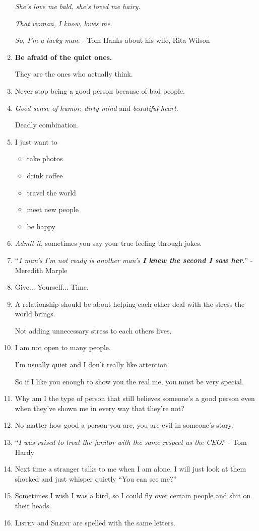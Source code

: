 \documentclass{article}
\begin{document}
\begin{enumerate}
	\textit{She's love me bald, she's loved me hairy}.
	
	\textit{That woman, I know, loves me}.
	
	\textit{So, I'm a lucky man}. - Tom Hanks about his wife, Rita Wilson
	\item \textbf{Be afraid of the quiet ones.}
	
	They are the ones who actually think.
	\item Never stop being a good person because of bad people.
	\item \textit{Good sense of humor}, \textit{dirty mind} and \textit{beautiful heart}.
	
	Deadly combination.
	\item I just want to
	\begin{itemize}
		\item take photos
		\item drink coffee
		\item travel the world
		\item meet new people
		\item be happy
	\end{itemize}
	\item \textit{Admit it}, sometimes you say your true feeling through jokes.
	\item ``\textit{1 man's \emph{I'm not ready} is another man's \textbf{I knew the second I saw her}.}'' - Meredith Marple
	\item Give$\ldots$ Yourself$\ldots$ Time.
	\item A relationship should be about helping each other deal with the stress the world brings.
	
	Not adding unnecessary stress to each others lives.
	\item I am not open to many people.
	
	I'm usually quiet and I don't really like attention.
	
	So if I like you enough to show you the real me, you must be very special.
	\item Why am I the type of person that still believes someone's a good person even when they've shown me in every way that they're not?
	\item No matter how good a person you are, you are evil in someone's story.
	\item ``\textit{I was raised to treat the janitor with the same respect as the CEO}.'' - Tom Hardy
	\item Next time a stranger talks to me when I am alone, I will just look at them shocked and just whisper quietly ``You can see me?''
	\item Sometimes I wish I was a bird, so I could fly over certain people and shit on their heads.
	\item \textsc{Listen} and \textsc{Silent} are spelled with the same letters.
	

\end{enumerate}
\end{document}
